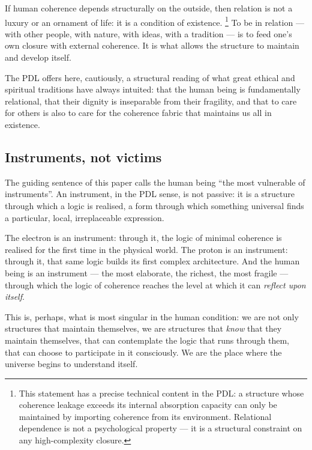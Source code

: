 \documentclass[11pt, a4paper, openright]{book}
\begin{document}
If human coherence depends structurally on the outside, then relation is not a luxury or an ornament of life: it is a condition of existence.%
  \footnote{This statement has a precise technical content in the PDL: a structure whose coherence leakage exceeds its internal absorption capacity can only be maintained by importing coherence from its environment. Relational dependence is not a psychological property — it is a structural constraint on any high-complexity closure.}
To be in relation — with other people, with nature, with ideas, with a tradition — is to feed one’s own closure with external coherence. It is what allows the structure to maintain and develop itself.

\medskip

The PDL offers here, cautiously, a structural reading of what great ethical and spiritual traditions have always intuited: that the human being is fundamentally relational, that their dignity is inseparable from their fragility, and that to care for others is also to care for the coherence fabric that maintains us all in existence.

\subsection*{Instruments, not victims}

The guiding sentence of this paper calls the human being “the most vulnerable of instruments”. An instrument, in the PDL sense, is not passive: it is a structure through which a logic is realised, a form through which something universal finds a particular, local, irreplaceable expression.

\medskip

The electron is an instrument: through it, the logic of minimal coherence is realised for the first time in the physical world. The proton is an instrument: through it, that same logic builds its first complex architecture. And the human being is an instrument — the most elaborate, the richest, the most fragile — through which the logic of coherence reaches the level at which it can \emph{reflect upon itself}.

\medskip

This is, perhaps, what is most singular in the human condition: we are not only structures that maintain themselves, we are structures that \emph{know} that they maintain themselves, that can contemplate the logic that runs through them, that can choose to participate in it consciously. We are the place where the universe begins to understand itself.
\end{document}
